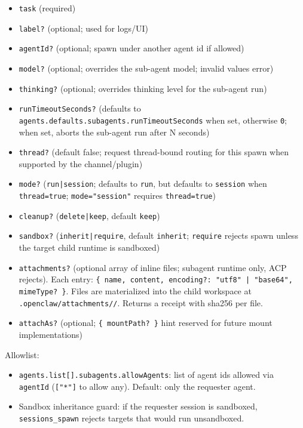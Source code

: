 \begin{itemize}
  \item \texttt{task} (required)
  \item \texttt{label?} (optional; used for logs/UI)
  \item \texttt{agentId?} (optional; spawn under another agent id if allowed)
  \item \texttt{model?} (optional; overrides the sub-agent model; invalid values error)
  \item \texttt{thinking?} (optional; overrides thinking level for the sub-agent run)
  \item \texttt{runTimeoutSeconds?} (defaults to \texttt{agents.defaults.subagents.runTimeoutSeconds} when set, otherwise \texttt{0}; when set, aborts the sub-agent run after N seconds)
  \item \texttt{thread?} (default false; request thread-bound routing for this spawn when supported by the channel/plugin)
  \item \texttt{mode?} (\texttt{run|session}; defaults to \texttt{run}, but defaults to \texttt{session} when \texttt{thread=true}; \texttt{mode="session"} requires \texttt{thread=true})
  \item \texttt{cleanup?} (\texttt{delete|keep}, default \texttt{keep})
  \item \texttt{sandbox?} (\texttt{inherit|require}, default \texttt{inherit}; \texttt{require} rejects spawn unless the target child runtime is sandboxed)
  \item \texttt{attachments?} (optional array of inline files; subagent runtime only, ACP rejects). Each entry: \texttt{\{ name, content, encoding?: "utf8" | "base64", mimeType? \}}. Files are materialized into the child workspace at \texttt{.openclaw/attachments//}. Returns a receipt with sha256 per file.
  \item \texttt{attachAs?} (optional; \texttt{\{ mountPath? \}} hint reserved for future mount implementations)
\end{itemize}


Allowlist:

\begin{itemize}
  \item \texttt{agents.list[].subagents.allowAgents}: list of agent ids allowed via \texttt{agentId} (\texttt{["*"]} to allow any). Default: only the requester agent.
  \item Sandbox inheritance guard: if the requester session is sandboxed, \texttt{sessions\_spawn} rejects targets that would run unsandboxed.
\end{itemize}


